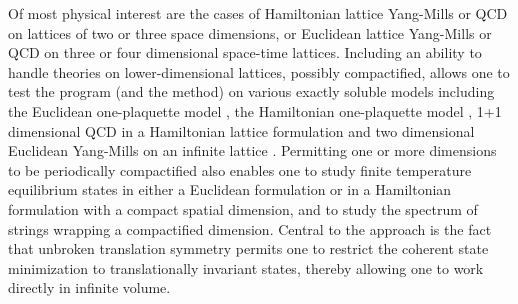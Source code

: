\documentclass [12pt]{article}
\begin{document}
Of most physical interest are the cases of
Hamiltonian lattice Yang-Mills or QCD
\cite{Kogut:1974ag}
on lattices of two or three space dimensions, or
Euclidean lattice Yang-Mills or QCD
\cite{Wilson:1974sk}
on three or four dimensional
space-time lattices.
Including an ability to handle theories on
lower-dimensional lattices, possibly compactified,
allows one to test the program
(and the method) on various exactly soluble models including
the Euclidean one-plaquette model
\cite{Gross:1980he},
the Hamiltonian one-plaquette model
\cite{Wadia:1980cp,Jevicki:1980zq,Neuberger:1980qh},
1+1 dimensional QCD in a Hamiltonian lattice formulation
\cite{Berruto:1999ir,Berruto:2002gn,Kiskis:2002gr,GarciaPerez:2016hph}
and
two dimensional Euclidean Yang-Mills on an infinite lattice
\cite{Gross:1980he}.
Permitting one or more dimensions to be periodically compactified
also enables one to study finite temperature equilibrium states
in either a Euclidean formulation or in a Hamiltonian
formulation with a compact spatial dimension, and to study
the spectrum of strings wrapping a compactified dimension.
%
Central to the approach is the fact that
unbroken translation symmetry permits one to restrict
the coherent state minimization to translationally invariant states,
thereby allowing one to work directly in infinite volume.
\end{document}
